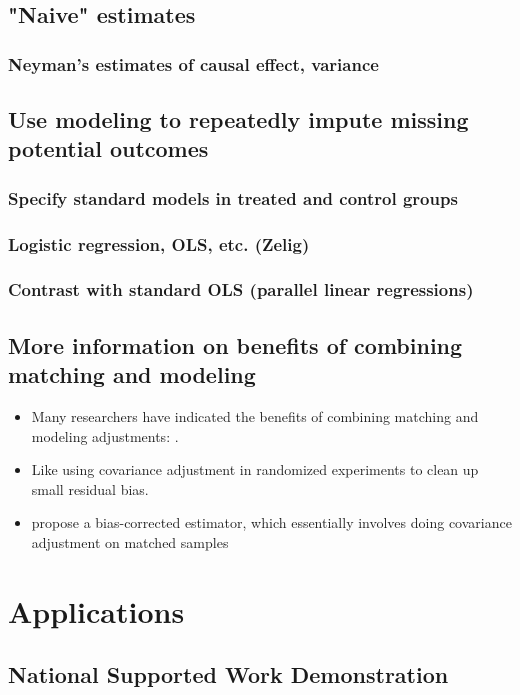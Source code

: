 \documentclass[11pt,titlepage]{article}
\begin{document}
\subsection{"Naive" estimates}
\subsubsection{Neyman's estimates of causal effect, variance}
\subsection{Use modeling to repeatedly impute missing potential outcomes}
\subsubsection{Specify standard models in treated and control groups}
\subsubsection{Logistic regression, OLS, etc. (Zelig)}
\subsubsection{Contrast with standard OLS (parallel linear regressions)}
\subsection{More information on benefits of combining matching and modeling}
\begin{itemize}
\item Many researchers have indicated the benefits of combining matching and modeling adjustments: \cite{Rubin73b, RobRot95, HecHidTod97, AbaImb04}.                          
\item Like using covariance adjustment in randomized experiments to clean up small residual bias.
\item \cite{AbaImb04} propose a bias-corrected estimator, which essentially involves doing covariance adjustment on matched samples
\end{itemize} 

                                                                                                                          
\section{Applications}
\subsection{National Supported Work Demonstration}
\end{document}
